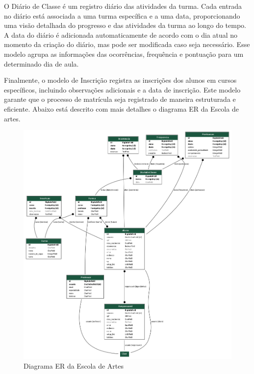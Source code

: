 O Diário de Classe é um registro diário das atividades da turma. Cada entrada no diário está associada a uma turma específica e a uma data, proporcionando uma visão detalhada do progresso e das atividades da turma ao longo do tempo. A data do diário é adicionada automaticamente de acordo com o dia atual no momento da criação do diário, mas pode ser modificada caso seja necessário. Esse modelo agrupa as informações das ocorrências, frequência e pontuação para um determinado dia de aula.

Finalmente, o modelo de Inscrição registra as inscrições dos alunos em cursos específicos, incluindo observações adicionais e a data de inscrição. Este modelo garante que o processo de matrícula seja registrado de maneira estruturada e eficiente. Abaixo está descrito com mais detalhes o diagrama ER da Escola de artes.


\begin{figure}[htb]
	\caption{\label{fig_grafico}Diagrama ER da Escola de Artes}
	\begin{center}
	    \includegraphics[scale=0.3]{./img/er_diagram_escola.png}
	\end{center}
\end{figure}

